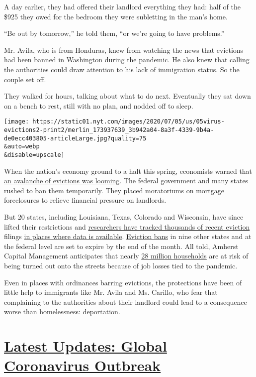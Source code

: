 A day earlier, they had offered their landlord everything they had: half
of the \$925 they owed for the bedroom they were subletting in the man's
home.

``Be out by tomorrow,'' he told them, ``or we're going to have
problems.''

Mr. Avila, who is from Honduras, knew from watching the news that
evictions had been banned in Washington during the pandemic. He also
knew that calling the authorities could draw attention to his lack of
immigration status. So the couple set off.

They walked for hours, talking about what to do next. Eventually they
sat down on a bench to rest, still with no plan, and nodded off to
sleep.

\texttt{[image: https://static01.nyt.com/images/2020/07/05/us/05virus-evictions2-print2/merlin\_173937639\_3b942a04-8a3f-4339-9b4a-de0ecc403805-articleLarge.jpg?quality=75\\\&auto=webp\\\&disable=upscale]}

When the nation's economy ground to a halt this spring, economists
warned that
\href{https://www.nytimes.com/2020/05/27/us/coronavirus-evictions-renters.html}{an
avalanche of evictions was looming}. The federal government and many
states rushed to ban them temporarily. They placed moratoriums on
mortgage foreclosures to relieve financial pressure on landlords.

But 20 states, including Louisiana, Texas, Colorado and Wisconsin, have
since lifted their restrictions and
\href{https://evictionlab.org/eviction-tracking/}{researchers have
tracked thousands of recent eviction} filings
\href{https://openjusticeok.shinyapps.io/ok-court-tracker/\#section-tool-by-open-justice-oklahoma}{in
places where data is available}.
\href{https://evictionlab.org/covid-policy-scorecard/}{Eviction bans} in
nine other states and at the federal level are set to expire by the end
of the month. All told, Amherst Capital Management anticipates that
nearly
\href{https://www.multihousingnews.com/post/housing-relief-skips-three-fifth-of-u-s-households/}{28
million households} are at risk of being turned out onto the streets
because of job losses tied to the pandemic.

Even in places with ordinances barring evictions, the protections have
been of little help to immigrants like Mr. Avila and Ms. Carillo, who
fear that complaining to the authorities about their landlord could lead
to a consequence worse than homelessness: deportation.

\hypertarget{latest-updates-global-coronavirus-outbreak}{%
\section{\texorpdfstring{\href{https://www.nytimes.com/2020/08/04/world/coronavirus-cases.html?action=click\&pgtype=Article\&state=default\&region=MAIN_CONTENT_1\&context=storylines_live_updates}{Latest
Updates: Global Coronavirus
Outbreak}}{Latest Updates: Global Coronavirus Outbreak}}\label{latest-updates-global-coronavirus-outbreak}}


